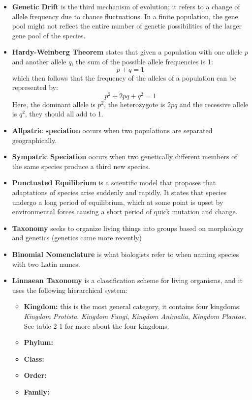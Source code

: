 \documentclass[10pt, landscape]{article}
\begin{document}
\begin{multicols}{2}
\begin{itemize}
				\item \textbf{Genetic Drift} is the third mechanism of evolution; it refers to a change of allele frequency due to chance fluctuations. In a finite population, the gene pool might not reflect the entire number of genetic possibilities of the larger gene pool of the species.
				\item \textbf{Hardy-Weinberg Theorem} states that given a population with one allele $p$ and another allele $q$, the sum of the possible allele frequencies is 1: $$ p + q = 1 $$ which then follows that the frequency of the alleles of a population can be represented by: $$ p^2 + 2pq + q^2 = 1 $$ Here, the dominant allele is $ p^2 $, the heterozygote is $ 2pq $ and the recessive allele is $ q^2 $, they should all add to 1.
				\item \textbf{Allpatric speciation} occurs when two populations are separated geographically.
				\item \textbf{Sympatric Speciation} occurs when two genetically different members of the same species produce a third new species.
				\item \textbf{Punctuated Equilibrium} is a scientific model that proposes that adaptations of species arise suddenly and rapidly. It states that species undergo a long period of equilibrium, which at some point is upset by environmental forces causing a short period of quick mutation and change.
				\item \textbf{Taxonomy} seeks to organize living things into groups based on morphology and genetics (genetics came more recently)
				\item \textbf{Binomial Nomenclature} is what biologists refer to when naming species with two Latin names.
				\item \textbf{Linnaean Taxonomy} is a classification scheme for living organisms, and it uses the following hierarchical system:
				\begin{itemize}
					\item \textbf{Kingdom:} this is the most general category, it contains four kingdoms: \textit{Kingdom Protista}, \textit{Kingdom Fungi}, \textit{Kingdom Animalia}, \textit{Kingdom Plantae}. See table 2-1 for more about the four kingdoms.
					\item \textbf{Phylum:} 
					\item \textbf{Class:}
					\item \textbf{Order:}
					\item \textbf{Family:}

\end{itemize}
\end{itemize}
\end{multicols}
\end{document}
